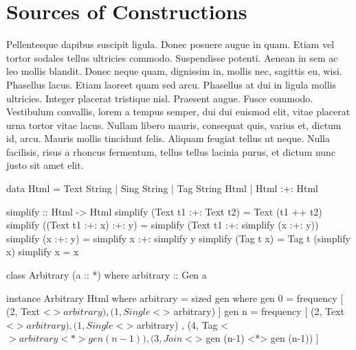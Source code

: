 \section{Sources of Constructions}
\label{sec:sources}

Pellentesque dapibus suscipit ligula. Donec posuere augue in quam. Etiam vel
tortor sodales tellus ultricies commodo. Suspendisse potenti. Aenean in sem ac
leo mollis blandit. Donec neque quam, dignissim in, mollis nec, sagittis eu,
wisi. Phasellus lacus. Etiam laoreet quam sed arcu. Phasellus at dui in ligula
mollis ultricies. Integer placerat tristique nisl. Praesent augue. Fusce
commodo. Vestibulum convallis, lorem a tempus semper, dui dui euismod elit,
vitae placerat urna tortor vitae lacus. Nullam libero mauris, consequat quis,
varius et, dictum id, arcu. Mauris mollis tincidunt felis. Aliquam feugiat
tellus ut neque. Nulla facilisis, risus a rhoncus fermentum, tellus tellus
lacinia purus, et dictum nunc justo sit amet elit.

\begin{code}
data Html
  =  Text  String
  |  Sing  String
  |  Tag   String Html
  |  Html  :+: Html
\end{code}


\begin{code}
simplify :: Html -> Html
simplify (Text t1 :+: Text t2)
  = Text (t1 ++ t2)
simplify ((Text t1 :+: x) :+: y)
  = simplify (Text t1 :+: simplify (x :+: y))
simplify (x :+: y)
  = simplify x :+: simplify y
simplify (Tag t x)
  = Tag t (simplify x)
simplify x = x
\end{code}

\begin{code}
class Arbitrary (a :: *) where
  arbitrary :: Gen a
\end{code}

\begin{code}
instance Arbitrary Html where
  arbitrary = sized gen
    where
      gen 0 = frequency
        [  (2,  Text    <$> arbitrary)
        ,  (1,  Single  <$> arbitrary) ]
      gen n = frequency
        [  (2,  Text    <$> arbitrary)
        ,  (1,  Single  <$> arbitrary)
        ,  (4,  Tag     <$> arbitrary  <*> gen (n-1))
        ,  (3,  Join    <$> gen (n-1)  <*> gen (n-1)) ]
\end{code} %
